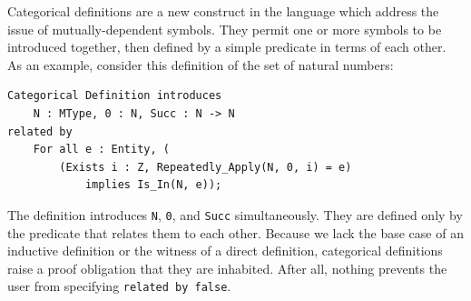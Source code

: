 Categorical definitions are a new construct in the language which address the issue of mutually-dependent symbols.  They permit one or more symbols to be introduced together, then defined by a simple predicate in terms of each other.  As an example, consider this definition of the set of natural numbers:

\begin{lstlisting}
Categorical Definition introduces
	N : MType, 0 : N, Succ : N -> N
related by
	For all e : Entity, (
		(Exists i : Z, Repeatedly_Apply(N, 0, i) = e)
			implies Is_In(N, e));
\end{lstlisting}

The definition introduces \texttt{N}, \texttt{0}, and \texttt{Succ} simultaneously.  They are defined only by the predicate that relates them to each other.  Because we lack the base case of an inductive definition or the witness of a direct definition, categorical definitions raise a proof obligation that they are inhabited.  After all, nothing prevents the user from specifying \texttt{related by false}.
